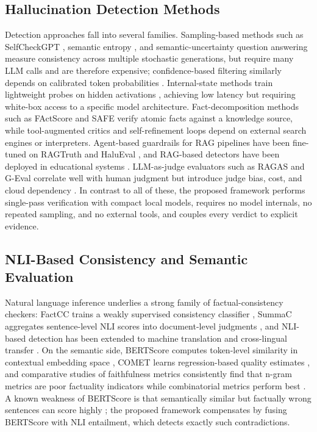 \documentclass[journal]{IEEEtran}
\begin{document}
\subsection{Hallucination Detection Methods}
Detection approaches fall into several families. Sampling-based methods such
as SelfCheckGPT \cite{manakul2023selfcheckgpt}, semantic entropy
\cite{farquhar2024semantic}, and semantic-uncertainty question answering
\cite{kuhn2023quest} measure consistency across multiple stochastic
generations, but require many LLM calls and are therefore expensive;
confidence-based filtering similarly depends on calibrated token
probabilities \cite{cao2022confidence}. Internal-state methods train
lightweight probes on hidden activations \cite{su2024mind,wang2024activation},
achieving low latency but requiring white-box access to a specific model
architecture. Fact-decomposition methods such as FActScore
\cite{min2023factscore} and SAFE \cite{wei2024longform} verify atomic facts
against a knowledge source, while tool-augmented critics
\cite{pan2023factool,gou2024critic} and self-refinement loops
\cite{madaan2023selfrefine} depend on external search engines or
interpreters. Agent-based guardrails for RAG pipelines have been fine-tuned
on RAGTruth and HaluEval \cite{mishra2025guardrails}, and RAG-based
detectors have been deployed in educational systems \cite{zheng2025educational}.
LLM-as-judge evaluators such as RAGAS \cite{es2024ragas} and G-Eval
\cite{liu2023geval} correlate well with human judgment but introduce judge
bias, cost, and cloud dependency \cite{fu2023judges,malin2025faithfulness}.
In contrast to all of these, the proposed framework performs single-pass
verification with compact local models, requires no model internals, no
repeated sampling, and no external tools, and couples every verdict to
explicit evidence.

\subsection{NLI-Based Consistency and Semantic Evaluation}
Natural language inference underlies a strong family of factual-consistency
checkers: FactCC trains a weakly supervised consistency classifier
\cite{kryscinski2020factcc}, SummaC aggregates sentence-level NLI scores
into document-level judgments \cite{laban2022summac}, and NLI-based
detection has been extended to machine translation \cite{song2021mt} and
cross-lingual transfer \cite{shwartz2024crosslingual}. On the semantic side,
BERTScore computes token-level similarity in contextual embedding space
\cite{zhang2020bertscore}, COMET learns regression-based quality estimates
\cite{rei2020comet}, and comparative studies of faithfulness metrics
consistently find that n-gram metrics are poor factuality indicators while
combinatorial metrics perform best
\cite{malin2025faithfulness,adlakha2024evaluating,fabbri2021summeval}. A
known weakness of BERTScore is that semantically similar but factually
wrong sentences can score highly \cite{zhang2020bertscore}; the proposed
framework compensates by fusing BERTScore with NLI entailment, which detects
exactly such contradictions.
\end{document}

